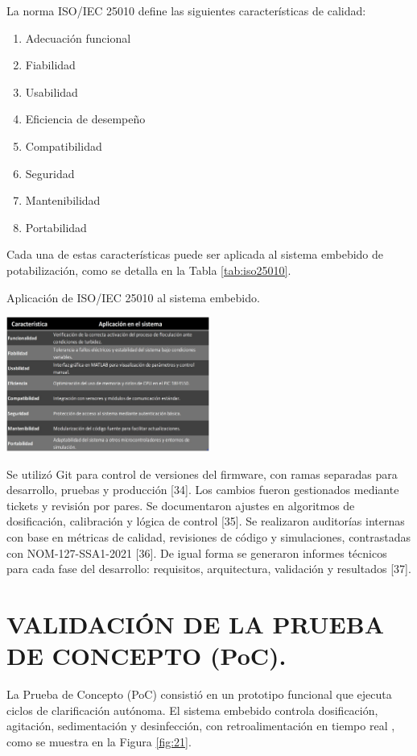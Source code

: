 \documentclass[conference]{IEEEtran}
\begin{document}
La norma ISO/IEC 25010 define las siguientes características de calidad:

\begin{enumerate}
	\item Adecuación funcional
	\item Fiabilidad
	\item Usabilidad
	\item Eficiencia de desempeño
	\item Compatibilidad
	\item Seguridad
	\item Mantenibilidad
	\item Portabilidad
\end{enumerate}

Cada una de estas características puede ser aplicada al sistema embebido de potabilización, como se detalla en la Tabla \ref{tab:iso25010}.



\begin{table}[h]
	\centering
	\caption{Aplicación de ISO/IEC 25010 al sistema embebido.}
	\includegraphics[width=0.5\textwidth]{tabla01.jpg}
	\label{tab:tabla01}
\end{table}

Se utilizó Git para control de versiones del firmware, con ramas separadas para desarrollo, pruebas y producción [34]. Los cambios fueron gestionados mediante tickets y revisión por pares. Se documentaron ajustes en algoritmos de dosificación, calibración y lógica de control [35]. Se realizaron auditorías internas con base en métricas de calidad, revisiones de código y simulaciones, contrastadas con NOM-127-SSA1-2021 [36].  De igual forma se generaron informes técnicos para cada fase del desarrollo: requisitos, arquitectura, validación y resultados [37].


\section{VALIDACIÓN DE LA PRUEBA DE CONCEPTO (PoC).}

La Prueba de Concepto (PoC) consistió en un prototipo funcional que ejecuta ciclos 
de clarificación autónoma. El sistema embebido controla dosificación, agitación, 
sedimentación y desinfección, con retroalimentación en tiempo real \cite{b38}, 
como se muestra en la Figura \ref{fig:21}.
\end{document}
